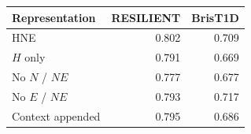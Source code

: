 \begin{tabular*}{\linewidth}{@{\extracolsep{\fill}}lrr@{}}
\toprule
Representation & RESILIENT & BrisT1D \\
\midrule
HNE & 0.802 & 0.709 \\
$H$ only & 0.791 & 0.669 \\
No $N$ / $NE$ & 0.777 & 0.677 \\
No $E$ / $NE$ & 0.793 & 0.717 \\
Context appended & 0.795 & 0.686 \\
\bottomrule
\end{tabular*}